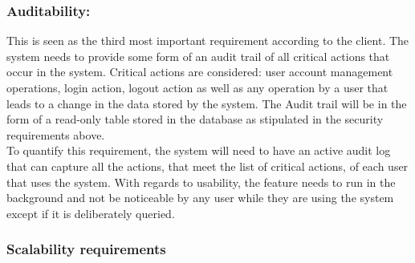 \vspace{0.1in}

\subsubsection{Auditability:}

\begin{flushleft}

This is seen as the third most important requirement according to the client. The system needs to provide some form of an audit trail of all critical actions that occur in the system. Critical actions are considered: user account management operations, login action, logout action as well as any operation by a user that leads to a change in the data stored by the system. The Audit trail will be in the form of a read-only table stored in the database as stipulated in the security requirements above.\\

To quantify this requirement, the system will need to have an active audit log that can capture all the actions, that meet the list of critical actions, of each user that uses the system. With regards to usability, the feature needs to run in the background and not be noticeable by any user while they are using the system except if it is deliberately queried.

\vspace{0.1in}

\end{flushleft}

\subsubsection{Scalability requirements}


